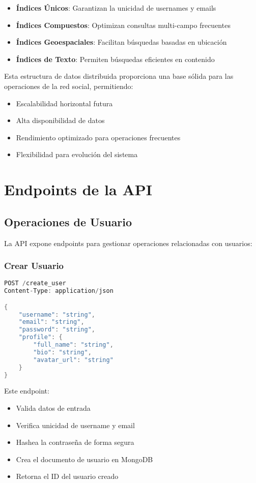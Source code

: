 \documentclass[12pt,letterpaper]{article}
\begin{document}
\begin{itemize}
    \item \textbf{Índices Únicos}: Garantizan la unicidad de usernames y emails
    \item \textbf{Índices Compuestos}: Optimizan consultas multi-campo frecuentes
    \item \textbf{Índices Geoespaciales}: Facilitan búsquedas basadas en ubicación
    \item \textbf{Índices de Texto}: Permiten búsquedas eficientes en contenido
\end{itemize}

Esta estructura de datos distribuida proporciona una base sólida para las operaciones de la red social, permitiendo:

\begin{itemize}
    \item Escalabilidad horizontal futura
    \item Alta disponibilidad de datos
    \item Rendimiento optimizado para operaciones frecuentes
    \item Flexibilidad para evolución del sistema
\end{itemize}

\section{Endpoints de la API}
\subsection{Operaciones de Usuario}
La API expone endpoints para gestionar operaciones relacionadas con usuarios:

\subsubsection{Crear Usuario}
\begin{lstlisting}[language=rust]
POST /create_user
Content-Type: application/json

{
    "username": "string",
    "email": "string",
    "password": "string",
    "profile": {
        "full_name": "string",
        "bio": "string",
        "avatar_url": "string"
    }
}
\end{lstlisting}

Este endpoint:
\begin{itemize}
    \item Valida datos de entrada
    \item Verifica unicidad de username y email
    \item Hashea la contraseña de forma segura
    \item Crea el documento de usuario en MongoDB
    \item Retorna el ID del usuario creado
\end{itemize}
\end{document}
